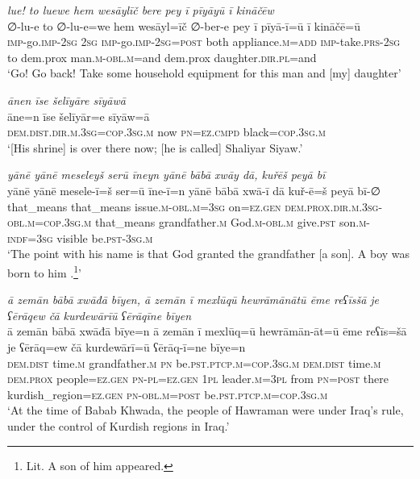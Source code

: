 \ea \label{ŽP.262}
\textit{lue! to luewe hem wesāylīč bere pey ī pīyāyū ī kināčēw} \\ 
\gll ∅-lu-e to ∅-lu-e=we hem wesāyl=īč ∅-ber-e pey ī pīyā-ī=ū ī kināčē=ū \\ 
 \textsc{imp-}go.\textsc{imp-}\textsc{2sg} \textsc{2sg} \textsc{imp-}go.\textsc{imp-}\textsc{2sg}\textsc{=\textsc{post}} both appliance\textsc{.m}\textsc{=add} \textsc{imp-}take\textsc{.prs}-\textsc{2sg} to dem.prox man\textsc{.m}\textsc{-obl}\textsc{.m}=and dem.prox daughter\textsc{.dir}\textsc{.pl}=and \\ 
\glt `Go! Go back! Take some household equipment for this man and [my] daughter'
\z 
 
\ea \label{ŽP.267}
\textit{ānen īse šelīyāre sīyāwā} \\ 
\gll āne=n īse šelīyār=e sīyāw=ā \\ 
 \textsc{dem.dist}\textsc{.dir}\textsc{.m}\textsc{.3sg}\textsc{=cop}\textsc{.3sg}\textsc{.m} now \textsc{pn}\textsc{=ez}\textsc{.cmpd} black\textsc{=cop}\textsc{.3sg}\textsc{.m} \\ 
\glt `[His shrine] is over there now; [he is called] Shaliyar Siyaw.'
\z 
 
\ea \label{BP.3}
\textit{yānē yānē meseleyš serū īneyn yānē bābā xwāy dā, kuřēš peyā bī} \\ 
\gll yānē yānē mesele-ī=š ser=ū īne-ī=n yānē bābā xwā-ī dā kuř-ē=š peyā bī-∅ \\ 
 that\_means that\_means issue\textsc{.m}\textsc{-obl}\textsc{.m}\textsc{=3sg} on\textsc{=ez.gen} \textsc{dem.prox}\textsc{.dir}\textsc{.m}\textsc{.3sg}\textsc{-obl}\textsc{.m}\textsc{=cop}\textsc{.3sg}\textsc{.m} that\_means grandfather\textsc{.m} God\textsc{.m}\textsc{-obl}\textsc{.m} give\textsc{.pst} son\textsc{.m}\textsc{-indf}\textsc{=3sg} visible be\textsc{.pst}\textsc{-3sg}\textsc{.m} \\ 
\glt `The point with his name is that God granted the grandfather [a son]. A boy  was born to him .\footnote{Lit. A son of him appeared.}'
\z 
 
\ea \label{BP.9}
\textit{ā zemān bābā xwāđā bīyen, ā zemān ī mexlūqū hewrāmānātū ēme reʕīsšā je ʕērāqew čā kurdewārīū ʕērāqīne bīyen} \\ 
\gll ā zemān bābā xwāđā bīye=n ā zemān ī mexlūq=ū hewrāmān-āt=ū ēme reʕīs=šā je ʕērāq=ew čā kurdewārī=ū ʕērāq-ī=ne bīye=n \\ 
 \textsc{dem.dist} time\textsc{.m} grandfather\textsc{.m} \textsc{pn} be\textsc{.pst}\textsc{.ptcp}\textsc{.m}\textsc{=cop}\textsc{.3sg}\textsc{.m} \textsc{dem.dist} time\textsc{.m} \textsc{dem.prox} people\textsc{=ez.gen} \textsc{pn}\textsc{\textsc{-pl}}\textsc{=ez.gen} \textsc{1pl} leader\textsc{.m}\textsc{=3pl} from \textsc{pn}\textsc{=\textsc{post}} there kurdish\_region\textsc{=ez.gen} \textsc{pn}\textsc{-obl}\textsc{.m}\textsc{=\textsc{post}} be\textsc{.pst}\textsc{.ptcp}\textsc{.m}\textsc{=cop}\textsc{.3sg}\textsc{.m} \\ 
\glt `At the time of Babab Khwada, the people of Hawraman were under Iraq’s rule, under the control of Kurdish regions in Iraq.'
\z 
 
